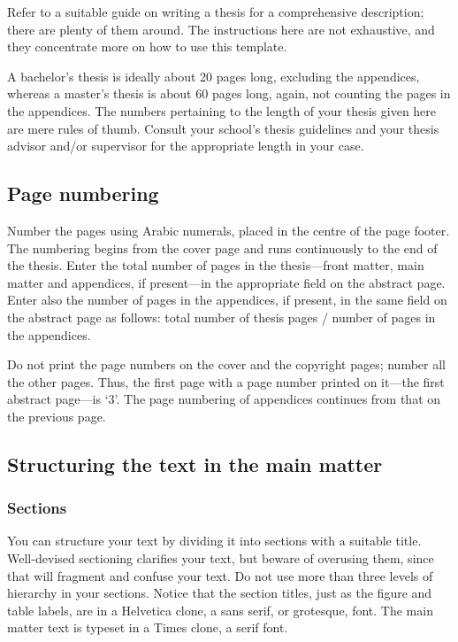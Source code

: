 \documentclass[english, 12pt, a4paper, biz, utf8, a-2b, online]{aaltothesis}
\begin{document}
Refer to a suitable guide on writing a thesis for a comprehensive description;
there are plenty of them around. The instructions here are not exhaustive, and
they concentrate more on how to use this template.

A bachelor’s thesis is ideally about 20 pages long, excluding the appendices, 
whereas a master’s thesis is about 60 pages long, again, not counting the pages
in the appendices. The numbers pertaining to the length of your thesis given
here are mere rules of thumb. Consult your school’s thesis guidelines and your 
thesis advisor and/or supervisor for the appropriate length in your case.


\subsection{Page numbering}
Number the pages using Arabic numerals, placed in the centre of the page footer.
The numbering begins from the cover page and runs continuously to the end of the 
thesis. Enter the total number of pages in the thesis---front matter, main
matter and appendices, if present---in the appropriate field on the abstract
page. Enter also the number of pages in the appendices, if present, in the same 
field on the abstract page as follows: total number of thesis pages / number of 
pages in the appendices.

Do not print the page numbers on the cover and the copyright pages; number all
the other pages. Thus, the first page with a page number printed on it---the
first abstract page---is ‘3’. The page numbering of appendices continues from
that on the previous page.


\subsection{Structuring the text in the main matter}
\subsubsection{Sections}

You can structure your text by dividing it into sections with a suitable title. 
Well-devised sectioning clarifies your text, but beware of overusing them, since 
that will fragment and confuse your text. Do not use more than three levels of 
hierarchy in your sections. Notice that the section titles, just as the figure
and table labels, are in a Helvetica clone, a sans serif, or grotesque, font. 
The main matter text is typeset in a Times clone, a serif font.
\end{document}
